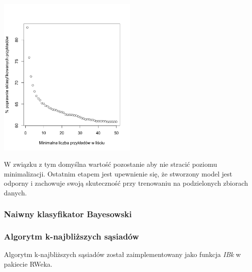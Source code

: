 \documentclass[11pt]{article} %
\begin{document}
\begin{center}
	\includegraphics[height=8cm]{binaryTree-minimumLeaf}
\end{center}

W związku z tym domyślna wartość pozostanie aby nie stracić poziomu minimalizacji. Ostatnim etapem jest upewnienie się, że stworzony model jest odporny i zachowuje swoją skuteczność przy trenowaniu na podzielonych zbiorach danych.

\subsubsection{Naiwny klasyfikator Bayesowski}


\subsubsection{Algorytm k-najbliższych sąsiadów}

Algorytm k-najbliższych sąsiadów został zaimplementowany jako funkcja \emph{IBk}  w pakiecie RWeka.
\end{document}
